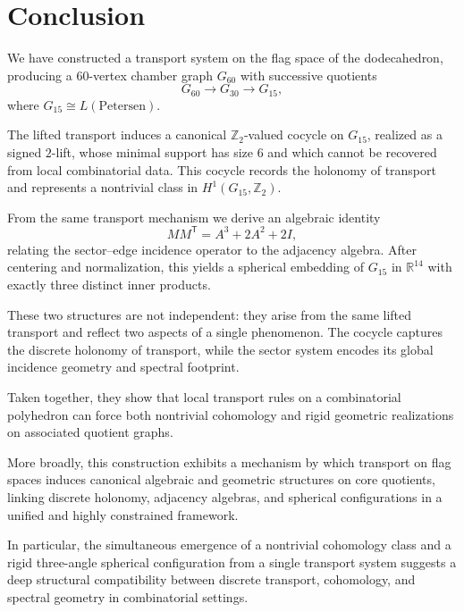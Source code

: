 \section{Conclusion}

We have constructed a transport system on the flag space of the
dodecahedron, producing a $60$-vertex chamber graph $G_{60}$ with
successive quotients
\[
G_{60} \to G_{30} \to G_{15},
\]
where $G_{15} \cong L(\mathrm{Petersen})$.

The lifted transport induces a canonical $\mathbb{Z}_2$-valued cocycle on
$G_{15}$, realized as a signed $2$-lift, whose minimal support has size $6$
and which cannot be recovered from local combinatorial data. This cocycle
records the holonomy of transport and represents a nontrivial class in
$H^1(G_{15},\mathbb{Z}_2)$.

From the same transport mechanism we derive an algebraic identity
\[
M M^{\mathsf T} = A^3 + 2A^2 + 2I,
\]
relating the sector--edge incidence operator to the adjacency algebra.
After centering and normalization, this yields a spherical embedding of
$G_{15}$ in $\mathbb{R}^{14}$ with exactly three distinct inner products.

These two structures are not independent: they arise from the same lifted
transport and reflect two aspects of a single phenomenon. The cocycle
captures the discrete holonomy of transport, while the sector system
encodes its global incidence geometry and spectral footprint.

Taken together, they show that local transport rules on a combinatorial
polyhedron can force both nontrivial cohomology and rigid geometric
realizations on associated quotient graphs.

More broadly, this construction exhibits a mechanism by which transport on
flag spaces induces canonical algebraic and geometric structures on core
quotients, linking discrete holonomy, adjacency algebras, and spherical
configurations in a unified and highly constrained framework.

In particular, the simultaneous emergence of a nontrivial cohomology class
and a rigid three-angle spherical configuration from a single transport
system suggests a deep structural compatibility between discrete
transport, cohomology, and spectral geometry in combinatorial settings.

